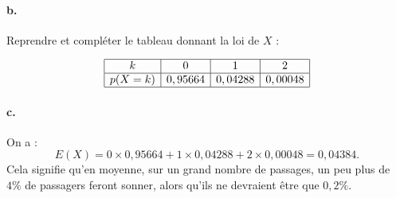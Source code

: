 	\paragraph{b.} Reprendre et compléter le tableau donnant la loi de \(X\) :
	
	\[
	\begin{array}{|c|c|c|c|}
		\hline
		k            & 0        & 1        & 2        \\
		\hline
		p(X = k)     & 0,95664 & 0,04288 & 0,00048 \\
		\hline
	\end{array}
	\]
	
	\paragraph{c.} On a :
	\[
	E(X) = 0 \times 0,95664 + 1 \times 0,04288 + 2 \times 0,00048 = 0,04384.
	\]
	Cela signifie qu'en moyenne, sur un grand nombre de passages, un peu plus de \(4\%\) de passagers feront sonner, alors qu'ils ne devraient être que \(0,2\%\).
